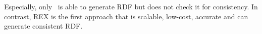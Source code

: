 Especially, only~\cite{conf/aaaiss/ParundekarKA10} is able to generate RDF but does not check it for consistency.
In contrast, REX is the first approach that is scalable, low-cost, accurate and can generate consistent RDF. 
%
%
%
%


